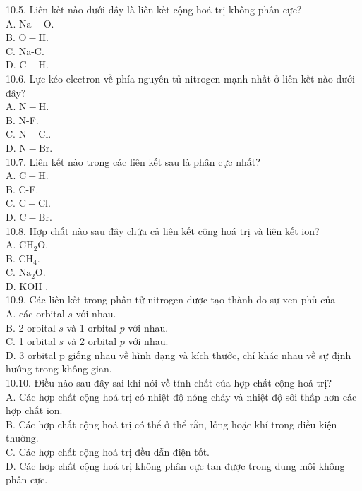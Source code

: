 \documentclass[10pt]{article}
\begin{document}
10.5. Liên kết nào dưới đây là liên kết cộng hoá trị không phân cực?\\
A. $\mathrm{Na}-\mathrm{O}$.\\
B. $\mathrm{O}-\mathrm{H}$.\\
C. Na-C.\\
D. $\mathrm{C}-\mathrm{H}$.\\
10.6. Lực kéo electron về phía nguyên tử nitrogen mạnh nhất ở liên kết nào dưới đây?\\
A. $\mathrm{N}-\mathrm{H}$.\\
B. N-F.\\
C. $\mathrm{N}-\mathrm{Cl}$.\\
D. $\mathrm{N}-\mathrm{Br}$.\\
10.7. Liên kết nào trong các liên kết sau là phân cực nhất?\\
A. $\mathrm{C}-\mathrm{H}$.\\
B. C-F.\\
C. $\mathrm{C}-\mathrm{Cl}$.\\
D. $\mathrm{C}-\mathrm{Br}$.\\
10.8. Hợp chất nào sau đây chứa cả liên kết cộng hoá trị và liên kết ion?\\
A. $\mathrm{CH}_{2} \mathrm{O}$.\\
B. $\mathrm{CH}_{4}$.\\
C. $\mathrm{Na}_{2} \mathrm{O}$.\\
D. KOH .\\
10.9. Các liên kết trong phân tử nitrogen được tạo thành do sự xen phủ của\\
A. các orbital $s$ với nhau.\\
B. 2 orbital $s$ và 1 orbital $p$ với nhau.\\
C. 1 orbital $s$ và 2 orbital $p$ với nhau.\\
D. 3 orbital p giống nhau về hình dạng và kích thước, chỉ khác nhau về sự định hướng trong không gian.\\
10.10. Điều nào sau đây sai khi nói về tính chất của hợp chất cộng hoá trị?\\
A. Các hợp chất cộng hoá trị có nhiệt độ nóng chảy và nhiệt độ sôi thấp hơn các hợp chất ion.\\
B. Các hợp chất cộng hoá trị có thể ở thể rắn, lỏng hoặc khí trong điều kiện thường.\\
C. Các hợp chất cộng hoá trị đều dẫn điện tốt.\\
D. Các hợp chất cộng hoá trị không phân cực tan được trong dung môi không phân cực.\\
\end{document}
